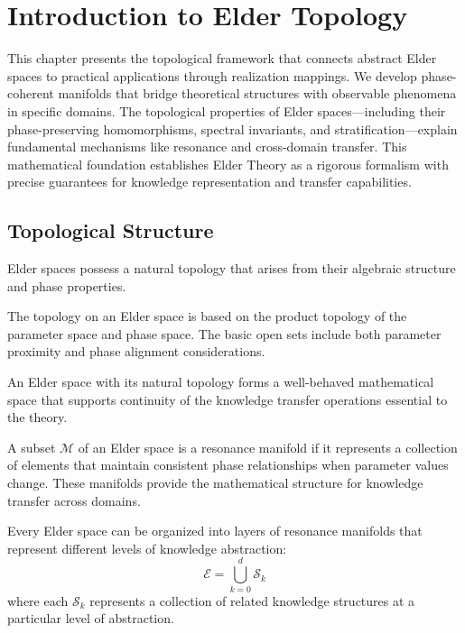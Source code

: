 \chapter{Introduction to Elder Topology}

\begin{chapterabstract}
This chapter presents the topological framework that connects abstract Elder spaces to practical applications through realization mappings. We develop phase-coherent manifolds that bridge theoretical structures with observable phenomena in specific domains. The topological properties of Elder spaces—including their phase-preserving homomorphisms, spectral invariants, and stratification—explain fundamental mechanisms like resonance and cross-domain transfer. This mathematical foundation establishes Elder Theory as a rigorous formalism with precise guarantees for knowledge representation and transfer capabilities.
\end{chapterabstract}

\section{Topological Structure}

Elder spaces possess a natural topology that arises from their algebraic structure and phase properties.

\begin{definition}
The topology on an Elder space is based on the product topology of the parameter space and phase space. The basic open sets include both parameter proximity and phase alignment considerations.
\end{definition}

\begin{theorem}
An Elder space with its natural topology forms a well-behaved mathematical space that supports continuity of the knowledge transfer operations essential to the theory.
\end{theorem}

\begin{definition}
A subset $\mathcal{M}$ of an Elder space is a resonance manifold if it represents a collection of elements that maintain consistent phase relationships when parameter values change. These manifolds provide the mathematical structure for knowledge transfer across domains.
\end{definition}

\begin{theorem}[Stratification]
Every Elder space can be organized into layers of resonance manifolds that represent different levels of knowledge abstraction:
\begin{equation}
\mathcal{E} = \bigcup_{k=0}^{d} \mathcal{S}_k
\end{equation}
where each $\mathcal{S}_k$ represents a collection of related knowledge structures at a particular level of abstraction.
\end{theorem}

